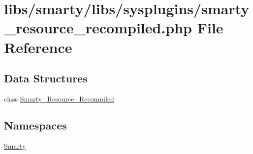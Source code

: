 \hypertarget{smarty__resource__recompiled_8php}{}\section{libs/smarty/libs/sysplugins/smarty\+\_\+resource\+\_\+recompiled.php File Reference}
\label{smarty__resource__recompiled_8php}
\subsection*{Data Structures}
\begin{DoxyCompactItemize}
\item 
class \hyperlink{class_smarty___resource___recompiled}{Smarty\+\_\+\+Resource\+\_\+\+Recompiled}
\end{DoxyCompactItemize}
\subsection*{Namespaces}
\begin{DoxyCompactItemize}
\item 
 \hyperlink{namespace_smarty}{Smarty}
\end{DoxyCompactItemize}
